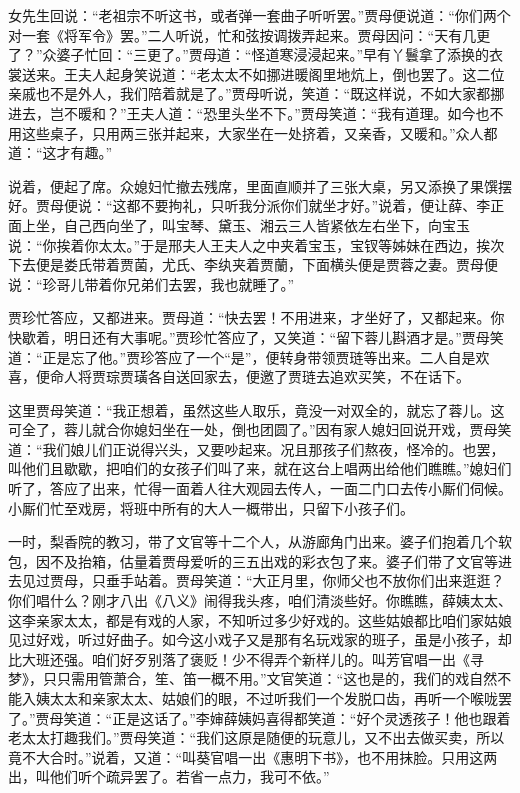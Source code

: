\documentclass[12pt,oneside]{book}
\begin{document}
女先生回说：“老祖宗不听这书，或者弹一套曲子听听罢。”贾母便说道：“你们两个对一套《将军令》罢。”二人听说，忙和弦按调拨弄起来。贾母因问：“天有几更了？”众婆子忙回：“三更了。”贾母道：“怪道寒浸浸起来。”早有丫鬟拿了添换的衣裳送来。王夫人起身笑说道：“老太太不如挪进暖阁里地炕上，倒也罢了。这二位亲戚也不是外人，我们陪着就是了。”贾母听说，笑道：“既这样说，不如大家都挪进去，岂不暖和？”王夫人道：“恐里头坐不下。”贾母笑道：“我有道理。如今也不用这些桌子，只用两三张并起来，大家坐在一处挤着，又亲香，又暖和。”众人都道：“这才有趣。”

说着，便起了席。众媳妇忙撤去残席，里面直顺并了三张大桌，另又添换了果馔摆好。贾母便说：“这都不要拘礼，只听我分派你们就坐才好。”说着，便让薛、李正面上坐，自己西向坐了，叫宝琴、黛玉、湘云三人皆紧依左右坐下，向宝玉说：“你挨着你太太。”于是邢夫人王夫人之中夹着宝玉，宝钗等姊妹在西边，挨次下去便是娄氏带着贾菌，尤氏、李纨夹着贾蘭，下面横头便是贾蓉之妻。贾母便说：“珍哥儿带着你兄弟们去罢，我也就睡了。”

贾珍忙答应，又都进来。贾母道：“快去罢！不用进来，才坐好了，又都起来。你快歇着，明日还有大事呢。”贾珍忙答应了，又笑道：“留下蓉儿斟酒才是。”贾母笑道：“正是忘了他。”贾珍答应了一个“是”，便转身带领贾琏等出来。二人自是欢喜，便命人将贾琮贾璜各自送回家去，便邀了贾琏去追欢买笑，不在话下。

这里贾母笑道：“我正想着，虽然这些人取乐，竟没一对双全的，就忘了蓉儿。这可全了，蓉儿就合你媳妇坐在一处，倒也团圆了。”因有家人媳妇回说开戏，贾母笑道：“我们娘儿们正说得兴头，又要吵起来。况且那孩子们熬夜，怪冷的。也罢，叫他们且歇歇，把咱们的女孩子们叫了来，就在这台上唱两出给他们瞧瞧。”媳妇们听了，答应了出来，忙得一面着人往大观园去传人，一面二门口去传小厮们伺候。小厮们忙至戏房，将班中所有的大人一概带出，只留下小孩子们。

一时，梨香院的教习，带了文官等十二个人，从游廊角门出来。婆子们抱着几个软包，因不及抬箱，估量着贾母爱听的三五出戏的彩衣包了来。婆子们带了文官等进去见过贾母，只垂手站着。贾母笑道：“大正月里，你师父也不放你们出来逛逛？你们唱什么？刚才八出《八义》闹得我头疼，咱们清淡些好。你瞧瞧，薛姨太太、这李亲家太太，都是有戏的人家，不知听过多少好戏的。这些姑娘都比咱们家姑娘见过好戏，听过好曲子。如今这小戏子又是那有名玩戏家的班子，虽是小孩子，却比大班还强。咱们好歹别落了褒贬！少不得弄个新样儿的。叫芳官唱一出《寻梦》，只只需用管萧合，笙、笛一概不用。”文官笑道：“这也是的，我们的戏自然不能入姨太太和亲家太太、姑娘们的眼，不过听我们一个发脱口齿，再听一个喉咙罢了。”贾母笑道：“正是这话了。”李婶薛姨妈喜得都笑道：“好个灵透孩子！他也跟着老太太打趣我们。”贾母笑道：“我们这原是随便的玩意儿，又不出去做买卖，所以竟不大合时。”说着，又道：“叫葵官唱一出《惠明下书》，也不用抹脸。只用这两出，叫他们听个疏异罢了。若省一点力，我可不依。”
\end{document}
